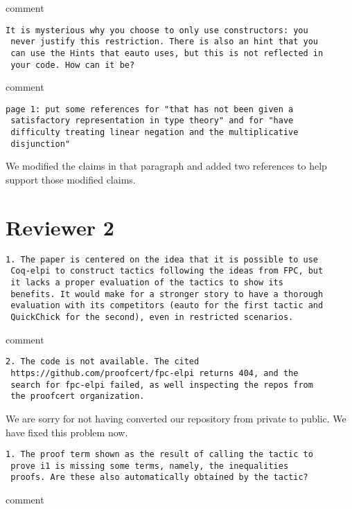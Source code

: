 \documentclass{article}
\begin{document}
comment

\begin{verbatim}
It is mysterious why you choose to only use constructors: you
 never justify this restriction. There is also an hint that you
 can use the Hints that eauto uses, but this is not reflected in
 your code. How can it be?
\end{verbatim}
comment

\begin{verbatim}
page 1: put some references for "that has not been given a
 satisfactory representation in type theory" and for "have
 difficulty treating linear negation and the multiplicative
 disjunction"
\end{verbatim}

We modified the claims in that paragraph and added two references
to help support those modified claims.

\section*{Reviewer 2}

\begin{verbatim}
1. The paper is centered on the idea that it is possible to use
 Coq-elpi to construct tactics following the ideas from FPC, but
 it lacks a proper evaluation of the tactics to show its
 benefits. It would make for a stronger story to have a thorough
 evaluation with its competitors (eauto for the first tactic and
 QuickChick for the second), even in restricted scenarios.
\end{verbatim}
comment

\begin{verbatim}
2. The code is not available. The cited
 https://github.com/proofcert/fpc-elpi returns 404, and the
 search for fpc-elpi failed, as well inspecting the repos from
 the proofcert organization.
\end{verbatim}

We are sorry for not having converted our repository from private
to public.  We have fixed this problem now.

\begin{verbatim}
1. The proof term shown as the result of calling the tactic to
 prove i1 is missing some terms, namely, the inequalities
 proofs. Are these also automatically obtained by the tactic?
\end{verbatim}

comment
\end{document}
